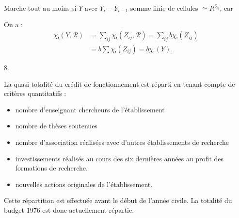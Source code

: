 Marche tout au moins si $Y$   avec $Y_i-Y_{i-1}$ somme finie de cellules $\simeq R^{\delta_{ij}}$, car

On a :
\[
\begin{aligned}
\chi_!(Y,\mathcal{R})&=\sum_{ij}\chi_!(Z_{ij},\mathcal{R})=\sum_{ij}b\chi_!(Z_{ij})\\
&=b\sum\chi_!(Z_{ij})=b\chi_!(Y).
\end{aligned}
\]
\margin{(\unsure{ct.} sur $Z_{ij}$\unsure{)|]}}


8.


La quasi totalité du crédit de fonctionnement est réparti en tenant compte de critères quantitatifs :
\begin{itemize}
\item[-] nombre d'enseignant chercheurs de l'établissement
\item[-] nombre de thèses soutenues
\item[-] nombre d'association réalisées avec d'autres établissements de recherche
\item[-] investissements réalisés au cours des six dernières années au profit des formations de recherche.
\item[-] nouvelles actions originales de l'établissement.
\end{itemize}

Cette répartition est effectuée avant le début de l'année civile. La totalité du budget 1976 est donc actuellement répartie.

